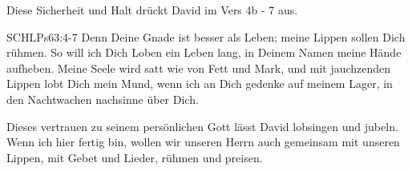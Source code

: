 \documentclass[14pt]{../../inc/mybib}
\begin{document}
    \begin{block}
        Diese Sicherheit und Halt drückt David im Vers 4b - 7 aus.
        \begin{bibelbox}{SCHL}{Ps}{63:4-7}
            Denn Deine Gnade ist besser als Leben; meine Lippen sollen Dich rühmen. So will ich Dich Loben ein Leben lang, in Deinem Namen meine Hände aufheben. Meine Seele wird satt wie von Fett und Mark, und mit jauchzenden Lippen lobt Dich mein Mund, wenn ich an Dich gedenke auf meinem Lager, in den Nachtwachen nachsinne über Dich.
        \end{bibelbox}
        Dieses vertrauen zu seinem persönlichen Gott lässt David lobsingen und jubeln.
        Wenn ich hier fertig bin, wollen wir unseren Herrn auch gemeinsam mit unseren Lippen, mit Gebet und Lieder, rühmen und preisen.
    \end{block}    
\end{document}
